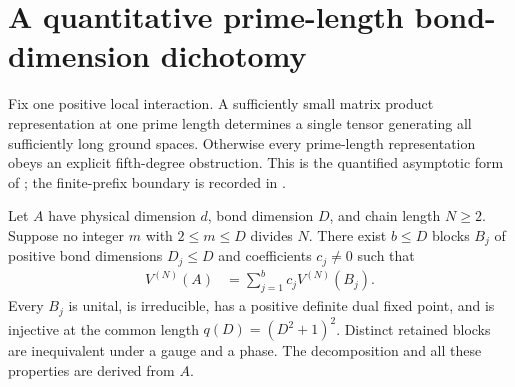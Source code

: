 \section{A quantitative prime-length bond-dimension dichotomy}

Fix one positive local interaction. A sufficiently small matrix product
representation at one prime length determines a single tensor generating all
sufficiently long ground spaces. Otherwise every prime-length representation
obeys an explicit fifth-degree obstruction. This is the quantified asymptotic
form of \cite[Theorem~5]{Sanz2010Quantum}; the finite-prefix boundary is
recorded in \cite{gap:spwc10_ground_state_dichotomy_quantifiers}.

\begin{lemma}
    \label{lem:normal_blocks_no_small_divisor}
    \leanok
    Let $A$ have physical dimension $d$, bond dimension $D$, and chain length
    $N\ge2$. Suppose no integer $m$ with $2\le m\le D$ divides $N$. There
    exist $b\le D$ blocks $B_j$ of positive bond dimensions $D_j\le D$ and
    coefficients $c_j\ne0$ such that
    \begin{align}
        V^{(N)}(A) & =\sum_{j=1}^b c_jV^{(N)}(B_j).
        \label{eq:normal_blocks_no_small_divisor}
    \end{align}
    Every $B_j$ is unital, is irreducible, has a positive definite dual fixed
    point, and is injective at the common length $q(D)=(D^2+1)^2$.
    Distinct retained blocks are inequivalent under a gauge and a phase.
    The decomposition and all these properties are derived from $A$.
\end{lemma}
